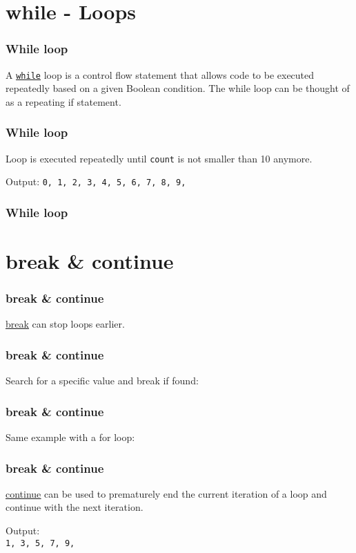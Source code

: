 \documentclass{beamer}
\newcommand{\hrefu}[2]{\underline{\href{#1}{#2}}}
\begin{document}
\section{while - Loops}
\begin{frame}
\frametitle{While loop}
A \hrefu{https://www.w3schools.com/python/python_while_loops.asp}{\texttt{while}} loop is a control flow statement that allows code to be executed repeatedly based on a given Boolean condition. The while loop can be thought of as a repeating if statement. 

\end{frame}
\begin{frame}
  \frametitle{While loop}
  Loop is executed repeatedly until \texttt{count} is not smaller than 10 anymore. 
  
  Output:
  \texttt{0, 1, 2, 3, 4, 5, 6, 7, 8, 9, }
\end{frame} 
\begin{frame}
  \frametitle{While loop}
  
\end{frame}
\section{break \& continue}
\begin{frame}
  \frametitle{break \& continue}
  \hrefu{https://www.w3schools.com/python/ref_keyword_break.asp}{break} can stop loops earlier. 
  
\end{frame}



\begin{frame}
  \frametitle{break \& continue}
  Search for a specific value and break if found: 
  
\end{frame}
\begin{frame}
  \frametitle{break \& continue}
  Same example with a for loop:
  
\end{frame}
\begin{frame}
  \frametitle{break \& continue}
  \hrefu{https://www.w3schools.com/python/ref_keyword_continue.asp}{continue} can be used to prematurely end the current iteration of a loop and continue with the next iteration.
  
  Output: \\
  \texttt{1, 3, 5, 7, 9, }
\end{frame}
\end{document}
